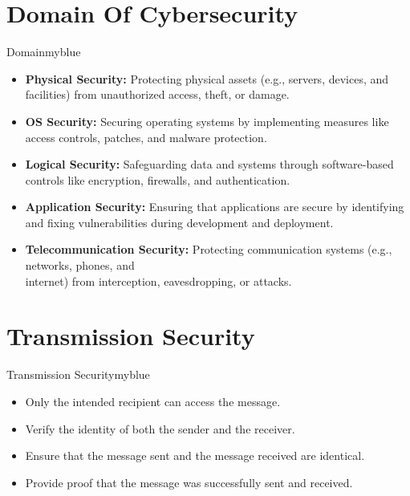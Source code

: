 \section{Domain Of Cybersecurity}
\begin{prettyBox}{Domain}{myblue}
\begin{itemize}
\item \textbf{Physical Security:} Protecting physical assets (e.g., servers,
devices, and facilities) from unauthorized access, theft, or damage.
\item \textbf{OS Security:} Securing operating systems by implementing measures
like access controls, patches, and malware protection.
\item \textbf{Logical Security:} Safeguarding data and systems through 
software-based controls like encryption, firewalls, and authentication.
\item \textbf{Application Security:} Ensuring that applications are secure by
identifying and fixing vulnerabilities during development and deployment.
\item \textbf{Telecommunication Security:} Protecting communication systems
(e.g., networks, phones, and \\internet) from interception, eavesdropping, or 
attacks.
\end{itemize}
\end{prettyBox}

\vspace{0.75cm}

\section{Transmission Security}
\begin{prettyBox}{Transmission Security}{myblue}
\begin{itemize}
    \item Only the intended recipient can access the message.
    \item Verify the identity of both the sender and the receiver.
    \item Ensure that the message sent and the message received are identical.
    \item Provide proof that the message was successfully sent and received.
\end{itemize}
\end{prettyBox}

\vspace{0.75cm}
